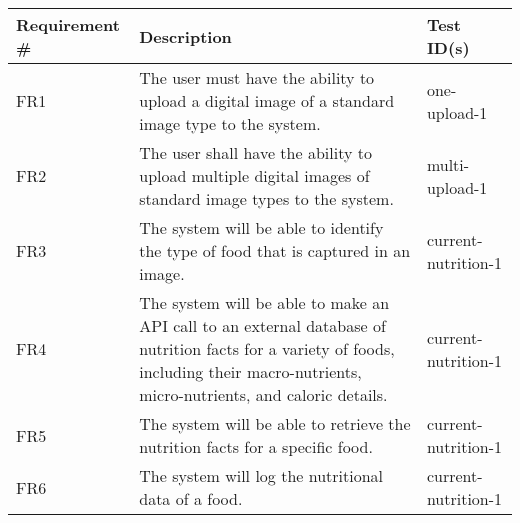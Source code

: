\documentclass[12pt, titlepage]{article}
\begin{document}
	\begin{table}[]
	
	\begin{tabular}{|p{3.5cm}|p{6.5cm}|p{4.5cm}|}

	\hline
	\textbf{Requirement \#} & \textbf{Description}                                                                                                                                                                  & \textbf{Test ID(s)}                                                                                          \\ \hline
	FR1                     & The user must have the ability to upload a digital image of a standard image type to the system.                                                                                      & one-upload-1                                                                                                 \\ \hline
	FR2                     & The user shall have the ability to upload multiple digital images of standard image types to the system.                                                                              & multi-upload-1                                                                                               \\ \hline
	FR3                     & The system will be able to identify the type of food that is captured in an image.                                                                                                    & current-nutrition-1                                                                                          \\ \hline
	FR4                     & The system will be able to make an API call to an external database of nutrition facts for a variety of foods, including their macro-nutrients, micro-nutrients, and caloric details. & current-nutrition-1                                                                                          \\ \hline
	FR5                     & The system will be able to retrieve the nutrition facts for a specific food.                                                                                                          & current-nutrition-1                                                                                          \\ \hline
	FR6                     & The system will log the nutritional data of a food.                                                                                                                                   & current-nutrition-1                                                                                          \\ \hline

\end{tabular}
\end{table}
\end{document}
